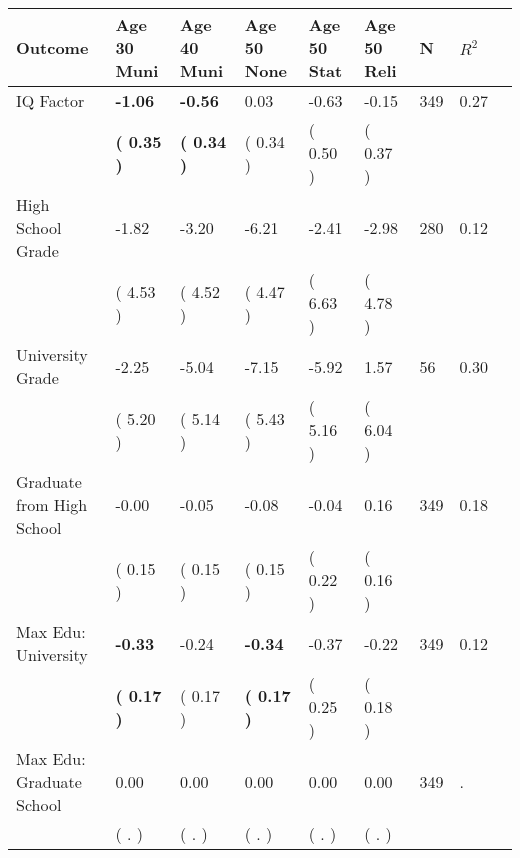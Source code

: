 \begin{tabular}{L{6.2cm} C{1.8cm} C{1.8cm} C{1.8cm} C{1.8cm} C{1.8cm} C{1.8cm} C{0.3cm} C{0.3cm}}
\toprule
 \textbf{Outcome} & \textbf{Age 30 Muni} & \textbf{Age 40 Muni} & \textbf{Age 50 None} & \textbf{Age 50 Stat} & \textbf{Age 50 Reli} & \textbf{N} & \textbf{$ R^2$} \\
\midrule
IQ Factor & \textbf{    -1.06} & \textbf{    -0.56} &      0.03 &     -0.63 &     -0.15  & 349 &       0.27 \\ 
 & \textbf{(     0.35 )} & \textbf{(     0.34 )} & (     0.34 ) & (     0.50 ) & (     0.37 )  & \\
High School Grade &     -1.82 &     -3.20 &     -6.21 &     -2.41 &     -2.98  & 280 &       0.12 \\ 
 & (     4.53 ) & (     4.52 ) & (     4.47 ) & (     6.63 ) & (     4.78 )  & \\
University Grade &     -2.25 &     -5.04 &     -7.15 &     -5.92 &      1.57  & 56 &       0.30 \\ 
 & (     5.20 ) & (     5.14 ) & (     5.43 ) & (     5.16 ) & (     6.04 )  & \\
Graduate from High School &     -0.00 &     -0.05 &     -0.08 &     -0.04 &      0.16  & 349 &       0.18 \\ 
 & (     0.15 ) & (     0.15 ) & (     0.15 ) & (     0.22 ) & (     0.16 )  & \\
Max Edu: University & \textbf{    -0.33} &     -0.24 & \textbf{    -0.34} &     -0.37 &     -0.22  & 349 &       0.12 \\ 
 & \textbf{(     0.17 )} & (     0.17 ) & \textbf{(     0.17 )} & (     0.25 ) & (     0.18 )  & \\
Max Edu: Graduate School &      0.00 &      0.00 &      0.00 &      0.00 &      0.00  & 349 &          . \\ 
 & (        . ) & (        . ) & (        . ) & (        . ) & (        . )  & \\
\bottomrule
\end{tabular}
